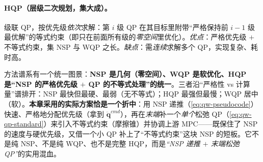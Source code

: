 \paragraph{HQP（层级二次规划，集大成）。}
级联 QP，按优先级\emph{依次}求解：第 $i$ 级 QP 在其目标里附带“严格保持前 $i-1$ 级最优解”的等式约束（即只在前面所有级的\emph{零空间}里优化）。\emph{优点}：严格优先级 $+$ 不等式约束，集 NSP 与 WQP 之长。\emph{缺点}：需\emph{连续}求解多个 QP，实现复杂、耗时高。

\begin{insight}\label{ins:qw-spectrum}
方法谱系有一个统一图景：\textbf{NSP 是几何（零空间）、WQP 是软优化、HQP 是“NSP 的严格优先级 $+$ QP 的不等式处理”的统一}。三者沿“严格性 vs 计算量”谱排开：NSP 最快但最硬、最弱（无不等式）；HQP 最强但最慢；WQP 居中（软）。\textbf{本章采用的实际方案恰是一个折中}：用 NSP 递推（\cref{eq:qw-pseudocode}）快速、严格地分配优先级（拿到 $\ddot{\boldsymbol{q}}^{cmd}$），再在\emph{末端}补一个\emph{单个}松弛 QP（\cref{eq:qw-qp-standard}）来引入不等式约束（摩擦锥）并协调上游 MPC——既保住了 NSP 的速度与硬优先级，又借一个小 QP 补上了“不等式约束”这块 NSP 的短板。它不是纯 NSP、不是纯 WQP、也不是完整 HQP，而是\emph{“NSP 递推 $+$ 末端松弛 QP”}的实用混血。
\end{insight}

